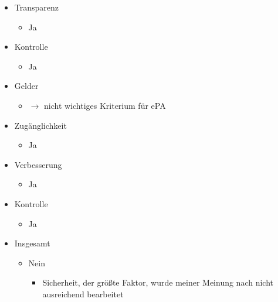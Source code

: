 \documentclass[a4paper]{assignment}
\begin{document}
\begin{problemlist}
\begin{itemize}
	\item Transparenz
	\begin{itemize}
		\item Ja
	\end{itemize}
	\item Kontrolle
	\begin{itemize}
		\item Ja
	\end{itemize}
	\item Gelder
	\begin{itemize}
		\item $\rightarrow$ nicht wichtiges Kriterium für ePA
	\end{itemize}	
	\item Zugänglichkeit
	\begin{itemize}
		\item Ja
	\end{itemize}	
	\item Verbesserung
	\begin{itemize}
		\item Ja
	\end{itemize}	
	\item Kontrolle
	\begin{itemize}
		\item Ja
	\end{itemize}	
	\item Insgesamt
	\begin{itemize}
		\item Nein
		\begin{itemize}
			\item Sicherheit, der größte Faktor, wurde meiner Meinung nach nicht ausreichend bearbeitet
		\end{itemize}
	\end{itemize}
\end{itemize}

\end{problemlist}

\newpage
\printbibliography
\end{document}
